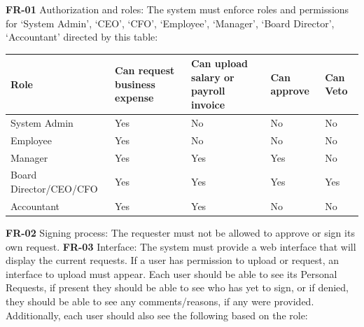 \documentclass[11pt,a4paper]{article}
\begin{document}
\textbf{FR-01} Authorization and roles: The system must enforce roles
and permissions for `System Admin', `CEO', `CFO', `Employee', `Manager',
`Board Director', `Accountant' directed by this table:

\begin{longtable}[]{@{}
  >{\centering\arraybackslash}p{}
  >{\centering\arraybackslash}p{}
  >{\centering\arraybackslash}p{}
  >{\centering\arraybackslash}p{}
  >{\centering\arraybackslash}p{}@{}}
\toprule\noalign{}
\begin{minipage}[b]{\linewidth}\centering
Role
\end{minipage} & \begin{minipage}[b]{\linewidth}\centering
Can request business expense
\end{minipage} & \begin{minipage}[b]{\linewidth}\centering
Can upload salary or payroll invoice
\end{minipage} & \begin{minipage}[b]{\linewidth}\centering
Can approve
\end{minipage} & \begin{minipage}[b]{\linewidth}\centering
Can Veto
\end{minipage} \\
\midrule\noalign{}
\endhead
\bottomrule\noalign{}
\endlastfoot
System Admin & Yes & No & No & No \\
Employee & Yes & No & No & No \\
Manager & Yes & Yes & Yes & No \\
Board Director/CEO/CFO & Yes & Yes & Yes & Yes \\
Accountant & Yes & Yes & No & No \\
\end{longtable}
\noindent\textbf{FR-02} Signing process: The requester must not be allowed to
approve or sign its own request.
\newpage
\noindent\textbf{FR-03} Interface: The system must provide a web interface that
will display the current requests. If a user has permission to upload or
request, an interface to upload must appear. Each user should be able to
see its Personal Requests, if present they should be able to see who has
yet to sign, or if denied, they should be able to see any
comments/reasons, if any were provided. Additionally, each user should
also see the following based on the role:
\end{document}
